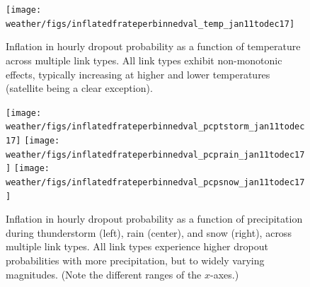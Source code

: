 


\begin{figure}[t]
\centering
\texttt{[image: weather/figs/inflatedfrateperbinnedval\_temp\_jan11todec17]}
\caption{
\label{fig:temp_cont}
\figdone
Inflation in hourly dropout probability as a function of temperature 
	across multiple link types. All link types exhibit non-monotonic
	effects, typically increasing at higher and lower temperatures
	(satellite being a clear exception).
}
\end{figure}

\newlength{\triplefigwidth}
\setlength{\triplefigwidth}{2.3in}
\begin{figure}[t]
\centering
\texttt{[image: weather/figs/inflatedfrateperbinnedval\_pcptstorm\_jan11todec17]}%
%
\hfill
%
\texttt{[image: weather/figs/inflatedfrateperbinnedval\_pcprain\_jan11todec17]}%
%
\hfill
%
\texttt{[image: weather/figs/inflatedfrateperbinnedval\_pcpsnow\_jan11todec17]}
\caption{
\label{fig:pcp_cont} Inflation in hourly dropout probability as a
	function of precipitation during thunderstorm (left), rain
	(center), and snow (right), across multiple link types. All link
	types experience higher dropout probabilities with more
	precipitation, but to widely varying magnitudes. (Note the
	different ranges of the $x$-axes.)}
\end{figure}


